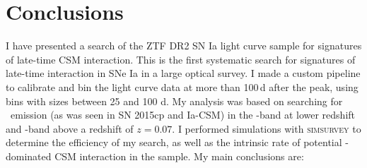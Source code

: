 \documentclass[a4paper,oneside,12pt, class=Latex/Classes/PhDthesisPSnPDF, crop=false]{standalone}
\begin{document}
\section{Conclusions}
\label{DR2_conclusion}
I have presented a search of the ZTF DR2 SN Ia light curve sample for signatures of late-time CSM interaction. This is the first systematic search for signatures of late-time interaction in SNe Ia in a large optical survey. I made a custom pipeline to calibrate and bin the light curve data at more than 100\,d after the peak, using bins with sizes between 25 and 100 d. My analysis was based on searching for \Halpha~emission (as was seen in SN 2015cp and Ia-CSM) in the \ztfr-band at lower redshift and \ztfi-band above a redshift of $z = 0.07$. I performed simulations with \textsc{simsurvey} to determine the efficiency of my search, as well as the intrinsic rate of potential \Halpha-dominated CSM interaction in the sample. My main conclusions are:
\end{document}

